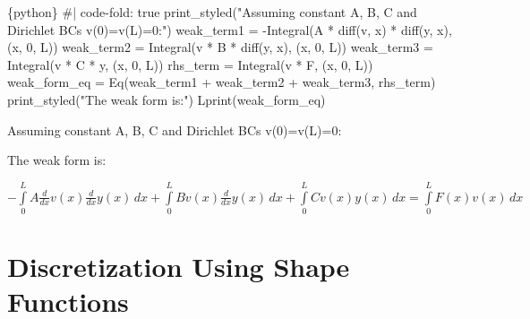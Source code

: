 \documentclass[
  11pt,
  a4paper,
]{scrbook}
\newenvironment{Shaded}{\begin{snugshade}}{\end{snugshade}}
\newcommand{\InformationTok}[1]{\textcolor[rgb]{0.37,0.37,0.37}{#1}}
\begin{document}
\begin{Shaded}
\begin{Highlighting}[]
\InformationTok{\textasciigrave{}\textasciigrave{}\textasciigrave{}\{python\}}
\InformationTok{\#| code{-}fold: true}
\InformationTok{print\_styled("Assuming constant A, B, C and Dirichlet BCs v(0)=v(L)=0:")}
\InformationTok{weak\_term1 = {-}Integral(A * diff(v, x) * diff(y, x), (x, 0, L))}
\InformationTok{weak\_term2 = Integral(v * B * diff(y, x), (x, 0, L))}
\InformationTok{weak\_term3 = Integral(v * C * y, (x, 0, L))}
\InformationTok{rhs\_term = Integral(v * F, (x, 0, L))}
\InformationTok{weak\_form\_eq = Eq(weak\_term1 + weak\_term2 + weak\_term3, rhs\_term)}
\InformationTok{print\_styled("The weak form is:")}
\InformationTok{Lprint(weak\_form\_eq)}
\InformationTok{\textasciigrave{}\textasciigrave{}\textasciigrave{}}
\end{Highlighting}
\end{Shaded}

Assuming constant A, B, C and Dirichlet BCs v(0)=v(L)=0:

The weak form is:

$\displaystyle - \int\limits_{0}^{L} A \frac{d}{d x} v{\left(x \right)} \frac{d}{d x} y{\left(x \right)}\, dx + \int\limits_{0}^{L} B v{\left(x \right)} \frac{d}{d x} y{\left(x \right)}\, dx + \int\limits_{0}^{L} C v{\left(x \right)} y{\left(x \right)}\, dx = \int\limits_{0}^{L} F{\left(x \right)} v{\left(x \right)}\, dx$

\section{Discretization Using Shape
Functions}\label{discretization-using-shape-functions}
\end{document}
